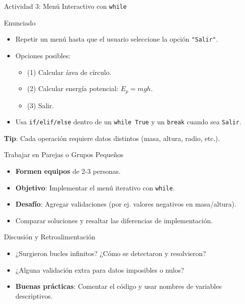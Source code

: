 \documentclass[10pt]{beamer}
\begin{document}
\begin{frame}{Actividad 3: Menú Interactivo con \texttt{while}}
  \begin{block}{Enunciado}
    \begin{itemize}
      \item Repetir un menú hasta que el usuario seleccione la opción \texttt{"Salir"}.
      \item Opciones posibles:
        \begin{itemize}
          \item (1) Calcular área de círculo.
          \item (2) Calcular energía potencial: \(E_p = mgh\).
          \item (3) Salir.
        \end{itemize}
      \item Usa \texttt{if/elif/else} dentro de un \texttt{while True} y un \texttt{break} cuando sea \texttt{Salir}.
    \end{itemize}
  \end{block}
  \textbf{Tip}: Cada operación requiere datos distintos (masa, altura, radio, etc.).
\end{frame}

\begin{frame}{Trabajar en Parejas o Grupos Pequeños}
  \begin{itemize}
    \item \textbf{Formen equipos} de 2-3 personas.
    \item \textbf{Objetivo}: Implementar el menú iterativo con \texttt{while}.
    \item \textbf{Desafío}: Agregar validaciones (por ej. valores negativos en masa/altura).
    \item Comparar soluciones y resaltar las diferencias de implementación.
  \end{itemize}
\end{frame}

\begin{frame}{Discusión y Retroalimentación}
  \begin{itemize}
    \item ¿Surgieron bucles infinitos? ¿Cómo se detectaron y resolvieron?
    \item ¿Alguna validación extra para datos imposibles o nulos?
    \item \textbf{Buenas prácticas}: Comentar el código y usar nombres de variables descriptivos.
  \end{itemize}
\end{frame}
\end{document}
